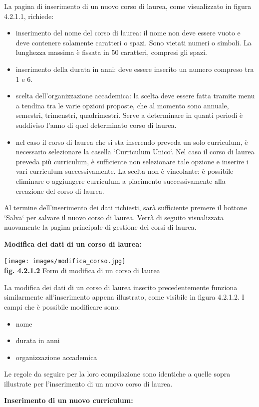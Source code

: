 \documentclass[11pt,a4paper]{article}
\begin{document}
La pagina di inserimento di un nuovo corso di laurea, come visualizzato in figura 4.2.1.1, richiede:
\begin{itemize}
 \item inserimento del nome del corso di laurea: il nome non deve essere vuoto e deve contenere solamente caratteri o spazi. Sono vietati numeri o simboli. La lunghezza massima è fissata in 50 caratteri, compresi gli spazi.
 \item inserimento della durata in anni: deve essere inserito un numero compreso tra 1 e 6.
 \item scelta dell'organizzazione accademica: la scelta deve essere fatta tramite menu a tendina tra le varie opzioni proposte, che al momento sono annuale, semestri, trimenstri, quadrimestri. Serve a determinare in quanti periodi è suddiviso l'anno di quel determinato corso di laurea.
 \item nel caso il corso di laurea che si sta inserendo preveda un solo curriculum, è necessario selezionare la casella `Curriculum Unico`. Nel caso il corso di laurea preveda più curriculum, è sufficiente non selezionare tale opzione e inserire i vari curriculum successivamente. La scelta non è vincolante: è possibile eliminare o aggiungere curriculum a piacimento successivamente alla creazione del corso di laurea.
\end{itemize}
Al termine dell'inserimento dei dati richiesti, sarà sufficiente premere il bottone `Salva` per salvare il nuovo corso di laurea. Verrà di seguito visualizzata nuovamente la pagina principale di gestione dei corsi di laurea. 
\newpage
\begin{large}\textbf{Modifica dei dati di un corso di laurea:}\end{large}

\begin{center}
	\texttt{[image: images/modifica\_corso.jpg]}\\
	\textbf{fig. 4.2.1.2} Form di modifica di un corso di laurea\\
\end{center}

La modifica dei dati di un corso di laurea inserito precedentemente funziona similarmente all'inserimento appena illustrato, come visibile in figura 4.2.1.2. I campi che è possibile modificare sono:
\begin{itemize}
 \item nome
 \item durata in anni
 \item organizzazione accademica
\end{itemize}
Le regole da seguire per la loro compilazione sono identiche a quelle sopra illustrate per l'inserimento di un nuovo corso di laurea.
\newline \newline
\begin{large}\textbf{Inserimento di un nuovo curriculum:}\end{large}
\end{document}
